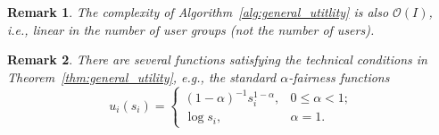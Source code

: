 \documentclass[twocolumn,10pt,twosided]{IEEEtran}
\newtheorem{remark}{Remark}
\newcommand{\eg}{\emph{e.g., }}
\newcommand{\ie}{\emph{i.e., }}
\begin{document}
\begin{remark}
The complexity of Algorithm~\ref{alg:general_utitlity} is also  $\mathcal{O}(I)$,  \ie linear in the number of user groups (not the number of users).
\end{remark}

\begin{remark}
There are several functions satisfying the technical conditions in Theorem~\ref{thm:general_utility}, \eg the standard  $\alpha$-fairness functions
$$
u_i(s_i)=
    \begin{cases}
(1-\alpha)^{-1}s_i^{1-\alpha},& 0\le\alpha< 1;\\
\log s_i, & \alpha=1.
     \end{cases}
$$
\end{remark}
\end{document}
